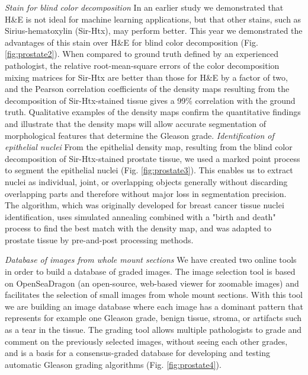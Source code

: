 \begin{enumerate}
{\textit{Stain for blind color decomposition} In an earlier study we demonstrated that H\&E is not ideal for machine learning applications, but that other stains, such as Sirius-hematoxylin (Sir-Htx), may perform better. This year we demonstrated the advantages of this stain over H\&E for blind color decomposition (Fig. \ref{fig:prostate2}). When compared to ground truth defined by an experienced pathologist, the relative root-mean-square errors of the color decomposition mixing matrices for Sir-Htx are better than those for H\&E by a factor of two, and the Pearson correlation coefficients of the density maps resulting from the decomposition of Sir-Htx-stained tissue gives a 99\% correlation with the ground truth. Qualitative examples of the density maps confirm the quantitative findings and illustrate that the density maps will allow accurate segmentation of morphological features that determine the Gleason grade.
\newpage
\textit{Identification of epithelial nuclei} From the epithelial density map, resulting from the blind color decomposition of Sir-Htx-stained prostate tissue, we used a marked point process to segment the epithelial nuclei (Fig. \ref{fig:prostate3}). This enables us to extract nuclei as individual, joint, or overlapping objects generally without discarding overlapping parts and therefore without major loss in segmentation precision. The algorithm, which was originally developed for breast cancer tissue nuclei identification, uses simulated annealing combined with a "birth and death" process to find the best match with the density map, and was adapted to prostate tissue by pre-and-post processing methods.

\textit{Database of images from whole mount sections} We have created two online tools in order to build a database of graded images. The image selection tool is based on OpenSeaDragon (an open-source, web-based viewer for zoomable images) and facilitates the selection of small images from whole mount sections. With this tool we are building an image database where each image has a dominant pattern that represents for example one Gleason grade, benign tissue, stroma, or artifacts such as a tear in the tissue. The grading tool allows multiple pathologists to grade and comment on the previously selected images, without seeing each other grades, and is a basis for a consensus-graded database for developing and testing automatic Gleason grading algorithms (Fig. \ref{fig:prostate4}).} 


\end{enumerate}
